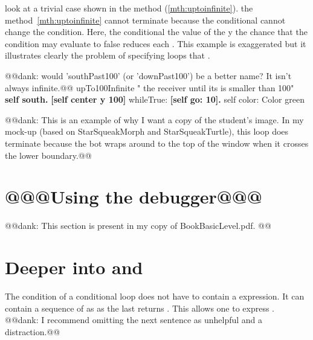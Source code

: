 {{{ look at a trivial case  shown in the method  (\ref{mth:uptoinfinite}).  the method~\ref{mth:uptoinfinite} cannot terminate because  the conditional  cannot change the condition. Here, the conditional   the value of the y  the chance that the condition may evaluate to false reduces  each . This example is exaggerated but it illustrates clearly the problem of specifying 
loops that . 

\begin{method}\label{mth:uptoinfinite}
@@dank: would 'southPast100' (or 'downPast100') be a better name?  It isn't always infinite.@@
upTo100Infinite
   " the receiver  until its  is smaller than 100"
   \textbf{self south.}
   \textbf{[self center y \replace{>}{>=} 100]}
      whileTrue: \textbf{[self go: 10].}
   self color: Color green
\end{method}
@@dank: This is an example of why I want a copy of the student's image.  In my mock-up (based on StarSqueakMorph and StarSqueakTurtle), this loop does terminate because the bot wraps around to the top of the window when it crosses the lower boundary.@@


\section{@@@Using the debugger@@@}
@@dank: This section is present in my copy of BookBasicLevel.pdf. @@


\section{Deeper into  and }
The condition of a conditional loop does not have to  contain  a  expression. It  can contain a sequence of  as  as the last  returns . This allows one to express . @@dank: I recommend omitting the next sentence as unhelpful and a distraction.@@ 

}}}
